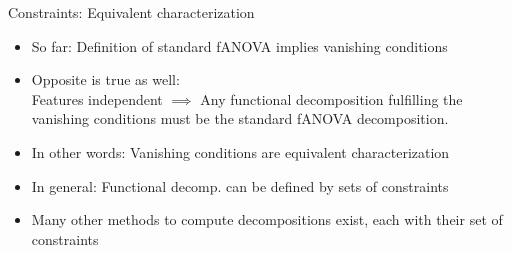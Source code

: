 \documentclass[10pt,compress,t,notes=noshow, xcolor=table]{beamer}
\begin{document}
\begin{frame}{Constraints: Equivalent characterization}

    \begin{itemize}[<+->]
    
        \item So far: Definition of standard fANOVA implies vanishing conditions
        \item Opposite is true as well: \\
        Features independent $\implies$ Any functional decomposition fulfilling the vanishing conditions must be the standard fANOVA decomposition.
        \item In other words: Vanishing conditions are equivalent characterization
        \item In general: Functional decomp. can be defined by sets of constraints \\
        \item Many other methods to compute decompositions exist, each with their set of constraints
    
    \end{itemize}

    
\end{frame}


    
    
    
    
    

     



\endlecture
\end{document}
